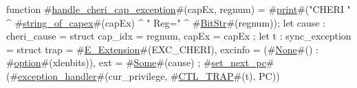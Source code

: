 function #\hyperref[sailRISCVzhandlezycherizycapzyexception]{handle\_cheri\_cap\_exception}#(capEx, regnum) =
  {
    #\hyperref[sailRISCVzprint]{print}#("CHERI " ^ #\hyperref[sailRISCVzstringzyofzycapex]{string\_of\_capex}#(capEx) ^ " Reg=" ^ #\hyperref[sailRISCVzBitStr]{BitStr}#(regnum));
    let cause : cheri_cause = struct {
        cap_idx = regnum,
        capEx   = capEx
    };
    let t : sync_exception = struct {
      trap    = #\hyperref[sailRISCVzEzyExtension]{E\_Extension}#(EXC_CHERI),
      excinfo = (#\hyperref[sailRISCVzNone]{None}#() : #\hyperref[sailRISCVzoption]{option}#(xlenbits)),
      ext     = #\hyperref[sailRISCVzSome]{Some}#(cause)
    };
    #\hyperref[sailRISCVzsetzynextzypc]{set\_next\_pc}#(#\hyperref[sailRISCVzexceptionzyhandler]{exception\_handler}#(cur_privilege, #\hyperref[sailRISCVzCTLzyTRAP]{CTL\_TRAP}#(t), PC))
  }
